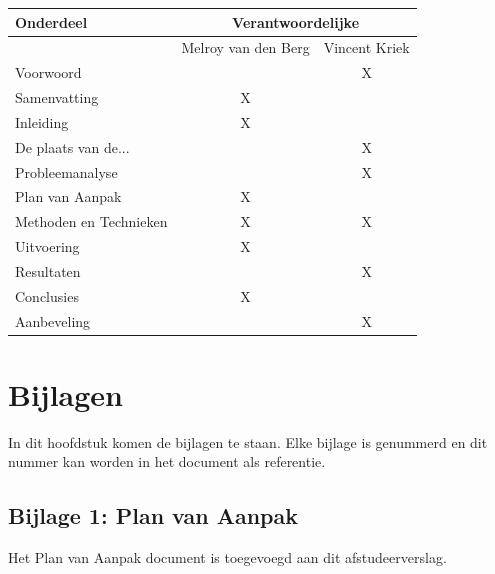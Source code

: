 \documentclass[]{article}
\begin{document}
\begin{tabular}{|| l | c | c ||}\hline
    Onderdeel              &   \multicolumn{2}{|c||}{Verantwoordelijke} \\\hline
                           & Melroy van den Berg & Vincent Kriek        \\\hline\hline
    Voorwoord              &                     &  X                   \\\hline
    Samenvatting           &       X             &                      \\\hline
    Inleiding              &       X             &                      \\\hline
    De plaats van de...    &                     &  X                   \\\hline
    Probleemanalyse        &                     &  X                   \\\hline
    Plan van Aanpak        &       X             &                      \\\hline
    Methoden en Technieken &       X             &  X                   \\\hline
    Uitvoering             &       X             &                      \\\hline
    Resultaten             &                     &  X                   \\\hline
    Conclusies             &       X             &                      \\\hline
    Aanbeveling            &                     &  X                   \\\hline
\end{tabular}              

\newpage
\section{Bijlagen}

In dit hoofdstuk komen de bijlagen te staan. Elke bijlage is genummerd en
dit nummer kan worden in het document als referentie.

\subsection{Bijlage 1: Plan van Aanpak}
Het Plan van Aanpak document is toegevoegd aan dit afstudeerverslag.

\newpage
\end{document}
